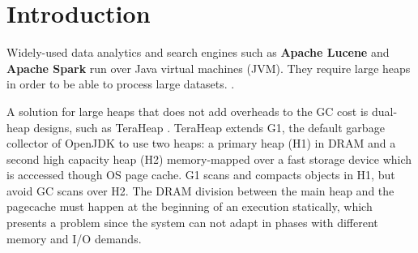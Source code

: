 \section{Introduction}


Widely-used data analytics and search engines such as \textbf{Apache Lucene}
\cite{klinaftakis2025thesis} and \textbf{Apache Spark} run over Java virtual
machines (JVM). They require large heaps in order to be able to process large
datasets. .

A solution for large heaps that does not add overheads to the GC cost is
dual-heap designs, such as TeraHeap . TeraHeap extends
G1, the default garbage collector of OpenJDK to use two heaps: a primary heap
(H1) in DRAM and a second high capacity heap (H2) memory-mapped over a fast
storage device which is acccessed though OS page cache. G1 scans and compacts
objects in H1, but avoid GC scans over H2. The DRAM division between the main
heap and the pagecache must happen at the beginning of an execution statically,
which presents a problem since the system can not adapt in phases with
different memory and I/O demands.

